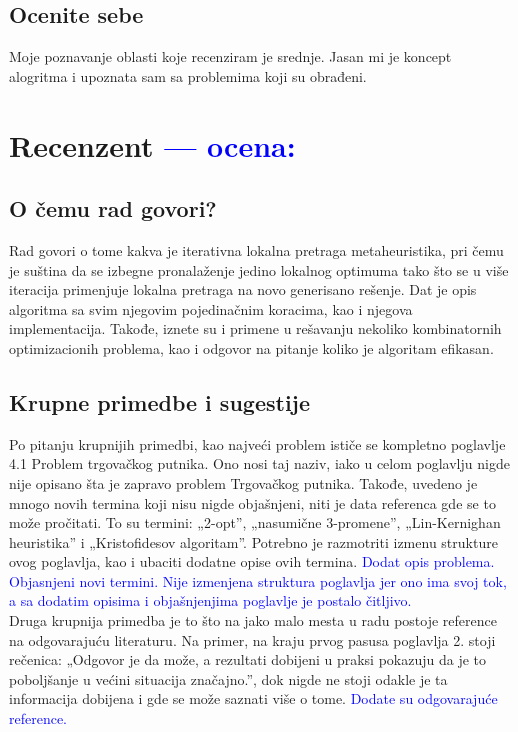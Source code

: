 \documentclass[a4paper]{report}
\newcommand{\odgovor}[1]{\textcolor{blue}{#1}}
\begin{document}
\section{Ocenite sebe}

Moje poznavanje oblasti koje recenziram je srednje. Jasan mi je koncept alogritma i upoznata sam sa problemima koji su obrađeni.


\chapter{Recenzent \odgovor{--- ocena:} }


\section{O čemu rad govori?}
Rad govori o tome kakva je iterativna lokalna pretraga metaheuristika, pri čemu je suština da se izbegne pronalaženje jedino lokalnog optimuma tako što se u više iteracija primenjuje lokalna pretraga na novo generisano rešenje. Dat je opis algoritma sa svim njegovim pojedinačnim koracima, kao i njegova implementacija. Takođe, iznete su i primene u rešavanju nekoliko kombinatornih optimizacionih problema, kao i odgovor na pitanje koliko je algoritam efikasan.

\section{Krupne primedbe i sugestije}
Po pitanju krupnijih primedbi, kao najveći problem ističe se kompletno poglavlje 4.1 Problem trgovačkog putnika. Ono nosi taj naziv, iako u celom poglavlju nigde nije opisano šta je zapravo problem Trgovačkog putnika. Takođe, uvedeno je mnogo novih termina koji nisu nigde objašnjeni, niti je data referenca gde se to može pročitati. To su termini: „2-opt”, „nasumične 3-promene”, „Lin-Kernighan heuristika” i „Kristofidesov algoritam”. Potrebno je razmotriti izmenu strukture ovog poglavlja, kao i ubaciti dodatne opise ovih termina.
\odgovor{Dodat opis problema. Objasnjeni novi termini. Nije izmenjena struktura poglavlja jer ono ima svoj tok, a sa dodatim opisima i objašnjenjima poglavlje je postalo čitljivo.\\}
Druga krupnija primedba je to što na jako malo mesta u radu postoje reference na odgovarajuću literaturu. Na primer, na kraju prvog pasusa poglavlja 2. stoji rečenica: „Odgovor je da može, a rezultati dobijeni u praksi pokazuju da je to poboljšanje u većini situacija značajno.”, dok nigde ne stoji odakle je ta informacija dobijena i gde se može saznati više o tome. \newline
\odgovor{Dodate su odgovarajuće reference.\\}
\end{document}
